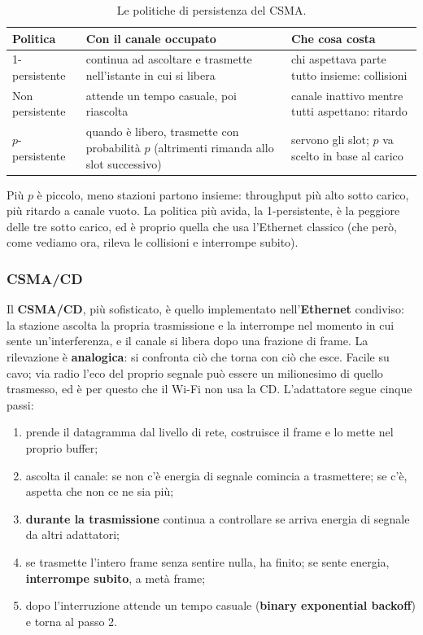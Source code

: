\begin{table}[H]
\centering
\begin{tabular}{p{2.6cm}p{5.6cm}p{5.6cm}}
\toprule
\textbf{Politica} & \textbf{Con il canale occupato} & \textbf{Che cosa costa} \\
\midrule
1-persistente & continua ad ascoltare e trasmette nell'istante in cui si libera & chi aspettava parte tutto insieme: collisioni \\
Non persistente & attende un tempo casuale, poi riascolta & canale inattivo mentre tutti aspettano: ritardo \\
$p$-persistente & quando è libero, trasmette con probabilità $p$ (altrimenti rimanda allo slot successivo) & servono gli slot; $p$ va
scelto in base al carico \\
\bottomrule
\end{tabular}
\caption{Le politiche di persistenza del CSMA.}
\end{table}

Più $p$ è piccolo, meno stazioni partono insieme: throughput più alto sotto carico, più ritardo a canale vuoto. La politica più avida,
la 1-persistente, è la peggiore delle tre sotto carico, ed è proprio quella che usa l'Ethernet classico (che però, come vediamo
ora, rileva le collisioni e interrompe subito).

\subsubsection*{CSMA/CD}

Il \textbf{CSMA/CD}, più sofisticato, è quello implementato nell'\textbf{Ethernet} condiviso: la stazione ascolta la propria
trasmissione e la interrompe nel momento in cui sente un'interferenza, e il canale si libera dopo una frazione di frame. La
rilevazione è \textbf{analogica}: si confronta ciò che torna con ciò che esce. Facile su cavo; via radio l'eco del proprio segnale
può essere un milionesimo di quello trasmesso, ed è per questo che il Wi-Fi non usa la CD. L'adattatore segue cinque passi:

\begin{enumerate}
    \item prende il datagramma dal livello di rete, costruisce il frame e lo mette nel proprio buffer;
    \item ascolta il canale: se non c'è energia di segnale comincia a trasmettere; se c'è, aspetta che non ce ne sia più;
    \item \textbf{durante la trasmissione} continua a controllare se arriva energia di segnale da altri adattatori;
    \item se trasmette l'intero frame senza sentire nulla, ha finito; se sente energia, \textbf{interrompe subito}, a metà frame;
    \item dopo l'interruzione attende un tempo casuale (\textbf{binary exponential backoff}) e torna al passo 2.
\end{enumerate}


